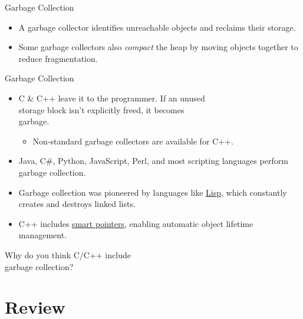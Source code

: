 \documentclass[14pt,aspectratio=1610]{beamer}
\begin{document}
\begin{frame}{Garbage Collection}

\begin{itemize}
\item
  A garbage collector identifies unreachable objects and reclaims their storage.
\item
  Some garbage collectors also \emph{compact} the heap by moving objects together to reduce fragmentation.
\end{itemize}
\end{frame}

\begin{frame}{Garbage Collection}

\begin{itemize}[<+->]
\item
  C \& C++ leave it to the programmer. If an unused \\
  storage block isn't explicitly freed, it becomes \\garbage.
  \begin{itemize}
  \item
    Non-standard garbage collectors are available for C++.
  \end{itemize}
\item
  Java, C\#, Python, JavaScript, Perl, and most scripting languages perform garbage collection.
\item
  Garbage collection was pioneered by languages like
  \href{https://en.wikipedia.org/wiki/Lisp_(programming_language)}{Lisp}, which
  constantly creates and destroys linked lists.

\item C++ includes \href{https://en.cppreference.com/w/cpp/memory}{smart pointers}, enabling automatic object lifetime management.
\end{itemize}
\end{frame}

\begin{frame}
\centering\Large
Why do you think C/C++ include\\ garbage collection?
\end{frame}


\section{Review}
\end{document}
